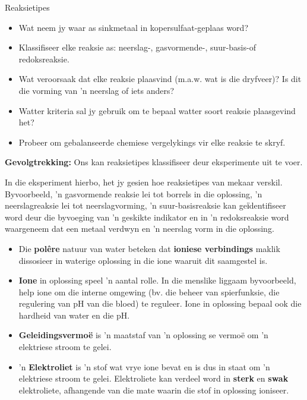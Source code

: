 {{\begin{g_experiment}{Reaksietipes}
\begin{itemize}[noitemsep]
\item Wat neem jy waar as sinkmetaal in kopersulfaat-geplaas word?
\item Klassifiseer elke reaksie as: neerslag-, gasvormende-, suur-basis-of redoksreaksie.
\item Wat veroorsaak dat elke reaksie plaasvind (m.a.w. wat is die dryfveer)? Is dit die vorming van  'n neerslag of iets anders?
\item Watter kriteria sal jy gebruik om te bepaal watter soort reaksie plaasgevind het?
\item Probeer om gebalanseerde chemiese vergelykings vir elke reaksie te skryf.
\end{itemize}
        \par 
\label{m38719*eip-1904}\noindent{}\textbf{Gevolgtrekking: }\newline
Ons kan reaksietipes klassifiseer deur eksperimente uit te voer.
\par 
\end{g_experiment}
In die eksperiment hierbo, het jy gesien hoe reaksietipes van mekaar verskil. Byvoorbeeld,  'n gasvormende reaksie lei tot borrels in die oplossing, 'n neerslagreaksie lei tot  neerslagvorming,  'n suur-basisreaksie kan geїdentifiseer word deur die byvoeging van  'n  geskikte indikator en in  'n redoksreaksie word waargeneem dat een metaal verdwyn en  'n neerslag vorm in die oplossing.\par  
\label{m38719*eip-796}
            \nopagebreak
            \label{m38719*eip-903}\begin{itemize}[noitemsep]
            \label{m38719*uid95}\item Die \textbf{pol\^{e}re} natuur van water beteken dat \textbf{ioniese verbindings} maklik dissosieer in waterige oplossing in die ione waaruit dit saamgestel is. 
\label{m38719*uid96}\item \textbf{Ione} in oplossing speel  'n aantal rolle. In die menslike liggaam byvoorbeeld, help ione om die interne omgewing (bv. die beheer van spierfunksie, die regulering van pH van die bloed) te reguleer. Ione in oplossing bepaal ook die hardheid van water en die pH. 
\label{m38719*uid100}\item \textbf{Geleidingsvermo\"{e}} is  'n maatstaf van  'n oplossing se vermoë om  'n elektriese stroom te gelei.
\label{m38719*uid101}\item  'n \textbf{Elektroliet} is 'n stof wat vrye ione bevat en is dus in staat om   'n elektriese stroom te gelei. Elektroliete kan verdeel word in \textbf{sterk} en \textbf{swak} elektroliete, afhangende van die mate waarin die stof in oplossing ioniseer.

\end{itemize}}}
